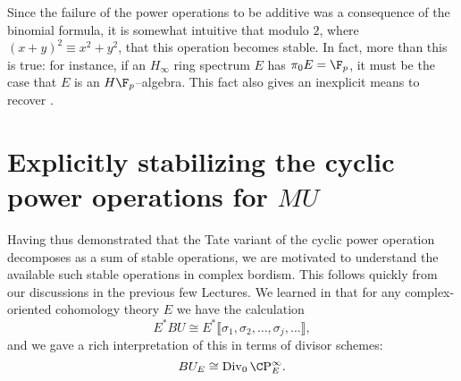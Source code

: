 \begin{remark}
Since the failure of the power operations to be additive was a consequence of the binomial formula, it is somewhat intuitive that modulo $2$, where $(x + y)^2 \equiv x^2 + y^2$, that this operation becomes stable.  In fact, more than this is true: for instance, if an $H_\infty$ ring spectrum $E$ has $\pi_0 E = \F_p$, it must be the case that $E$ is an $H\F_p$--algebra.  This fact also gives an inexplicit means to recover .
\end{remark}















\section{Explicitly stabilizing the cyclic power operations for \texorpdfstring{$MU$}{MU}}\label{StabilizingTheMUSteenrodOps}

Having thus demonstrated that the Tate variant of the cyclic power operation decomposes as a sum of stable operations, we are motivated to understand the available such stable operations in complex bordism.  This follows quickly from our discussions in the previous few Lectures.  We learned in  that for any complex-oriented cohomology theory $E$ we have the calculation \[E^* BU \cong E^*\llbracket \sigma_1, \sigma_2, \ldots, \sigma_j, \ldots\rrbracket,\] and we gave a rich interpretation of this in terms of divisor schemes: \[BU_E \cong \Div_0 \CP^\infty_E.\]

